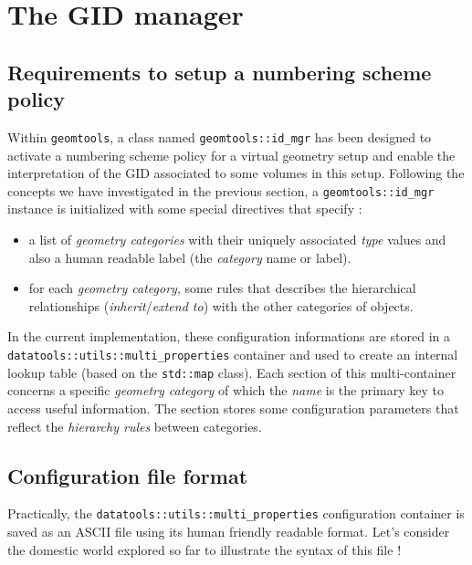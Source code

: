 
\section{The GID manager}

\subsection{Requirements to setup a numbering scheme policy}

\pn Within \texttt{geomtools},  a class named \verb+geomtools::id_mgr+
has been designed to activate  a numbering scheme policy for a virtual
geometry setup and enable the  interpretation of the GID associated to
some volumes  in this setup. Following the concepts we have investigated
in the previous section, a \verb+geomtools::id_mgr+
instance is initialized with some special directives that specify :

\begin{itemize}

\item  a  list  of  \emph{geometry  categories}  with  their  uniquely
  associated \emph{type}  values and also a human  readable label (the
  \emph{category} name or  label). 

\item for each \emph{geometry category}, some rules that describes the
  hierarchical relationships (\emph{inherit}/\emph{extend to}) 
  with the other categories of objects.

\end{itemize}

\pn  In the current  implementation, these  configuration informations
are stored in a \\
\texttt{datatools::utils::multi\_properties} container
and  used   to  create  an   internal  lookup  table  (based   on  the
\texttt{std::map}  class).   Each   section  of  this  multi-container
concerns a specific \emph{geometry  category} of which the \emph{name}
is the primary  key to access useful information.   The section stores
some configuration parameters  that reflect the \emph{hierarchy rules}
between categories.


\subsection{Configuration file format}

\pn   Practically,   the  \texttt{datatools::utils::multi\_properties}
configuration  container is  saved as  an ASCII  file using  its human
friendly readable format.  Let's  consider the domestic world explored
so far to illustrate the syntax of this file !

